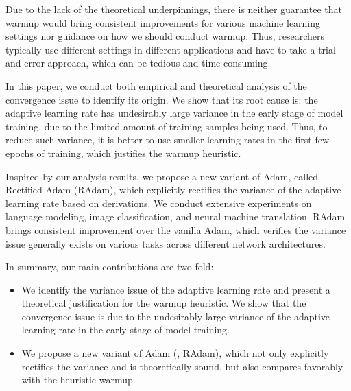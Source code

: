 Due to the lack of the theoretical underpinnings,
there is neither guarantee that warmup would 
bring consistent improvements for various machine learning settings 
nor guidance on how we should conduct warmup. 
Thus, researchers typically use different settings in different applications and have to take a trial-and-error approach,
which can be tedious and time-consuming. 

In this paper, we conduct both empirical and theoretical analysis of the convergence issue to identify its origin.
We show that its root cause is: the adaptive learning rate has undesirably large variance in the early stage of model training, due to the limited amount of training samples being used. 
Thus, to reduce such variance, it is better to use smaller learning rates in the first few epochs of training, which justifies the warmup heuristic.

Inspired by our analysis results, we propose a new variant of Adam, called Rectified Adam (RAdam), which explicitly rectifies the variance of the adaptive learning rate based on derivations.
We conduct extensive experiments on language modeling, image classification, and neural machine translation.
RAdam brings consistent improvement over the vanilla Adam, which verifies the variance issue generally exists on various tasks across different network architectures.

In summary, our main contributions are two-fold:
\begin{itemize}[leftmargin=*]
    \item
    \vspace{-0.1in}
    We identify the variance issue of the adaptive learning rate and present a theoretical justification for the warmup heuristic. 
    We show that the convergence issue is due to the undesirably large variance of the adaptive learning rate in the early stage of model training.
    \item 
    We propose a new variant of Adam (\ie, RAdam), which not only explicitly rectifies the variance and is theoretically sound, but also compares favorably with the heuristic warmup.
\end{itemize}
    
